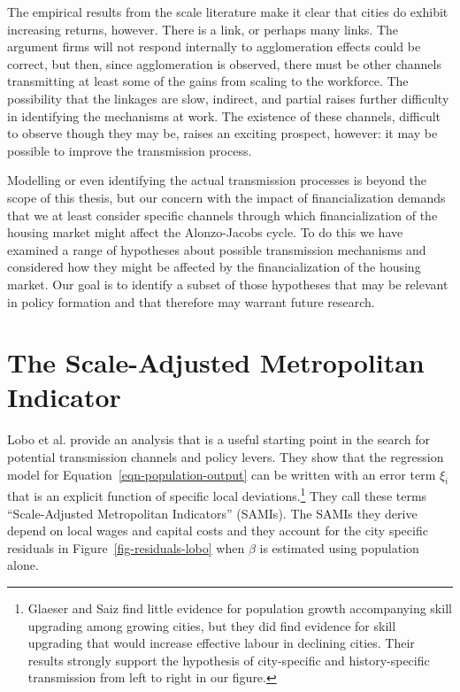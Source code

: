 
The empirical results from the scale literature  make it clear that cities do exhibit increasing returns, however. There is a link, or perhaps many links. The argument firms will not respond internally to agglomeration effects could be correct, but then, since agglomeration is observed, there must  be other channels  transmitting at least some of the gains from scaling to the workforce. The possibility that the linkages are slow, indirect, and partial raises further difficulty in identifying the mechanisms at work.  The existence of these channels, difficult to observe though they may be, raises an exciting prospect, however: it may be possible to improve the  transmission process. 


Modelling or even identifying  the actual transmission processes is beyond the scope of this thesis, but our concern with the impact of financialization demands that we at least consider specific channels through which financialization of the housing market might affect the Alonzo-Jacobs cycle. To do this we have examined a range of hypotheses about possible transmission mechanisms and considered how they might be affected by the financialization of the housing market. Our goal is to identify a subset of those hypotheses that may be relevant in policy formation and that therefore may warrant future research.



\section{The Scale-Adjusted Metropolitan Indicator}

 Lobo et al. \cite{loboUrbanScalingProduction2013} provide an  analysis that is a useful starting point in the search for potential transmission channels and policy levers. They show that the regression model for Equation~\ref{eqn-population-output} can be written with an error term $\xi_i$ that is an explicit  function of specific local deviations.\footnote{Glaeser and Saiz \cite{glaeserRiseSkilledCity2003} find little evidence for population growth accompanying skill upgrading among growing cities,  but they did find  evidence for skill upgrading that would increase effective labour in declining cities. Their results strongly  support the hypothesis of city-specific  and history-specific transmission from left to right in our figure.}  
They  call these terms ``Scale-Adjusted Metropolitan Indicators'' (SAMIs). The SAMIs they derive depend on local wages and capital costs and they account for the city specific residuals in Figure~\ref{fig-residuals-lobo} when $\beta$ is estimated using population alone. 
 
